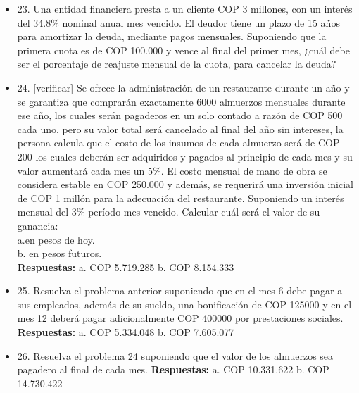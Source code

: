 \begin{itemize}
 \item 23. Una entidad financiera presta a un cliente COP 3 millones, con un interés del 34.8\% nominal anual mes vencido. El deudor tiene un plazo de 15 años para amortizar la deuda, mediante pagos mensuales. Suponiendo que la primera cuota es de COP 100.000 y vence al final del primer mes, ¿cuál debe ser el porcentaje de reajuste mensual de la cuota, para cancelar la deuda?\\
       \medskip

 \item 24. [verificar] Se ofrece la administración de un restaurante durante un año y se garantiza que comprarán exactamente 6000 almuerzos mensuales durante ese año, los cuales serán pagaderos en un solo contado a razón de COP 500 cada uno, pero su valor total será cancelado al final del año sin intereses, la persona calcula que el costo de los insumos de cada almuerzo será de COP 200 los cuales deberán ser adquiridos y pagados al principio de cada mes y su valor aumentará cada mes un 5\%. El costo mensual de mano de obra se considera estable en COP 250.000 y además, se requerirá una inversión inicial de COP 1 millón para la adecuación del restaurante. Suponiendo un interés mensual del 3\% período mes vencido. Calcular cuál será el valor de su ganancia:\\
       a.en pesos de hoy.\\
       b. en pesos futuros.\\
       \textbf{Respuestas:} a. COP 5.719.285 \hspace{1cm}  	b. COP 8.154.333\\
       \medskip

 \item 25. Resuelva el problema anterior suponiendo que en el mes 6 debe pagar a sus empleados, además de su sueldo, una bonificación de COP 125000 y en el mes 12 deberá pagar adicionalmente COP 400000 por prestaciones sociales.\\
       \textbf{Respuestas:}  a. COP 5.334.048 \hspace{1cm}  	b. COP 7.605.077\\
       \medskip

 \item 26. Resuelva el problema 24 suponiendo que el valor de los almuerzos sea pagadero al final de cada mes.
       \textbf{Respuestas:} a. COP 10.331.622 \hspace{1cm}  	b. COP 14.730.422\\
       \medskip


\end{itemize}
